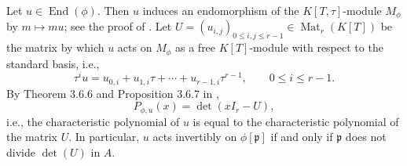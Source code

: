 \documentclass[12pt]{amsart}
\theoremstyle{definition}
\theoremstyle{remark}
\numberwithin{equation}{section}
\numberwithin{thm}{section}
\DeclareMathOperator{\End}{End}
\DeclareMathOperator{\Mat}{Mat}
\newcommand{\fp}{\mathfrak{p}}
\begin{document}
 Let $u\in \End(\phi)$. Then $u$ induces an endomorphism of the $K[T, \tau]$-module $M_\phi$ by $m\mapsto mu$; see the proof of \cite[Prop. 3.4.5]{PapikianGTM}. 
  Let $U=(u_{i,j})_{0\leq i, j\leq r-1}\in \Mat_r(K[T])$ be the matrix 
 by which $u$ acts on $M_\phi$ as a free $K[T]$-module with respect to the standard basis, i.e., 
 $$
 \tau^i u = u_{0, i} + u_{1, i}\tau+\cdots +u_{r-1, i}\tau^{r-1}, \qquad 0\leq i\leq r-1. 
 $$
 By Theorem 3.6.6 and Proposition 3.6.7 in \cite{PapikianGTM}, 
 \begin{equation}\label{eqPu}
 P_{\phi, u}(x)=\det(xI_r-U),
 \end{equation}
 i.e., the characteristic polynomial of $u$ is equal to the characteristic polynomial of the matrix $U$. 
 In particular, $u$ acts invertibly on $\phi[\fp]$ if and only if $\fp$ does not divide $\det(U)$ in $A$. 
 
\end{document}
